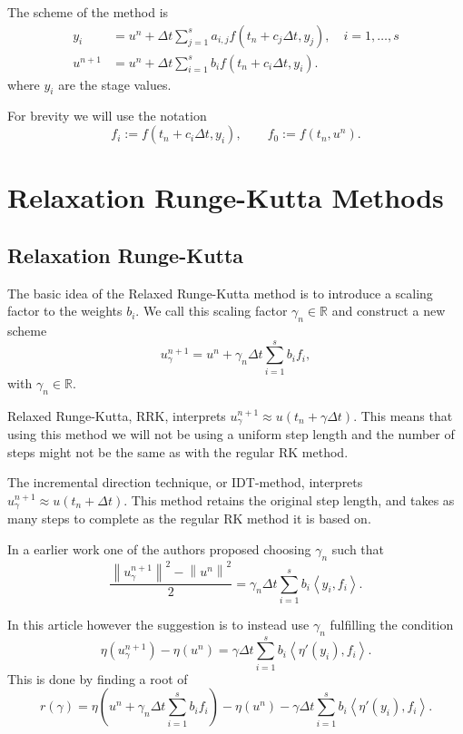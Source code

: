 \documentclass{report}
\newcommand{\norm}[1]{\left\lVert#1\right\rVert}
\newcommand{\inner}[2]{\left< #1 , #2 \right>}
\begin{document}
    \vspace*{7mm}
    \noindent
    The scheme of the method is
    \begin{align}
        y_i &= u^{n} + \Delta t\sum_{j=1}^{s} a_{i,j} f(t_n + c_j \Delta t, y_j), \quad i = 1,\ldots,s \label{Eq_RK_Stage} \\
        u^{n+1} &= u^{n} + \Delta t \sum_{i=1}^{s} b_i f(t_n + c_i \Delta t, y_i). \label{Eq_RK_Scheme}
    \end{align}
    where \(y_i\) are the stage values.

    \vspace*{7mm}
    \noindent
    For brevity we will use the notation
    \[f_i := f(t_n + c_i \Delta t, y_i), \qquad f_0 := f(t_n, u^n).\]


\chapter{Relaxation Runge-Kutta Methods}
\section{Relaxation Runge-Kutta}
    The basic idea of the Relaxed Runge-Kutta method is to introduce a scaling factor to the weights \(b_i\). We call this scaling factor \(\gamma_n \in \mathbb{R}\) and construct a new scheme
    \[u^{n+1}_{\gamma} = u^{n} + \gamma_n \Delta t \sum_{i=1}^{s} b_i f_i,\]
    with \(\gamma_n \in \mathbb{R}\).

    \vspace*{10mm}
    Relaxed Runge-Kutta, RRK, interprets \(u_{\gamma}^{n+1} \approx u(t_n + \gamma \Delta t)\). This means that using this method we will not be using a uniform step length and the number of steps might not be the same as with the regular RK method.

    \vspace*{5mm}
    The incremental direction technique, or IDT-method, interprets \(u_{\gamma}^{n+1} \approx u(t_n + \Delta t)\). This method retains the original step length, and takes as many steps to complete as the regular RK method it is based on.

    In a earlier work one of the authors proposed choosing \(\gamma_n\) such that
    \[ \frac{\norm{u^{n+1}_{\gamma}}^2 - \norm{u^{n}}^2}{2} = \gamma_n \Delta t \sum_{i=1}^{s} b_i \inner{y_i}{f_i} .\]

    In this article however the suggestion is to instead use \(\gamma_n\) fulfilling the condition
    \[  \eta (u^{n+1}_{\gamma}) - \eta (u^{n}) = \gamma \Delta t \sum_{i=1}^{s} b_i \inner{\eta'(y_i)}{f_i}.\]
    This is done by finding a root of
    \begin{equation}\label{Eq_r}
        r(\gamma) = \eta (u^{n} + \gamma_n \Delta t \sum_{i=1}^{s} b_i f_i) - \eta (u^{n}) - \gamma \Delta t \sum_{i=1}^{s} b_i \inner{\eta'(y_i)}{f_i}.
    \end{equation}
\end{document}
